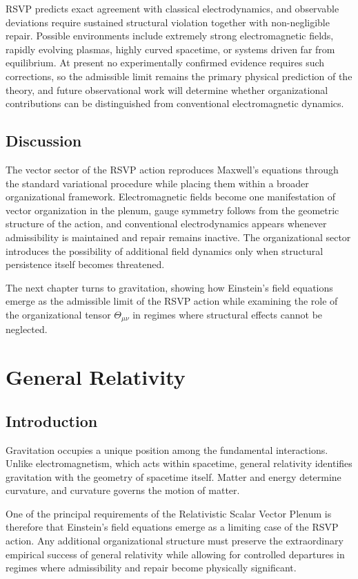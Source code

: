 \documentclass[11pt,oneside]{book}
\numberwithin{equation}{chapter}
\theoremstyle{definition}
\theoremstyle{plain}
\begin{document}
RSVP predicts exact agreement with classical electrodynamics, and observable deviations require sustained structural violation together with non-negligible repair. Possible environments include extremely strong electromagnetic fields, rapidly evolving plasmas, highly curved spacetime, or systems driven far from equilibrium. At present no experimentally confirmed evidence requires such corrections, so the admissible limit remains the primary physical prediction of the theory, and future observational work will determine whether organizational contributions can be distinguished from conventional electromagnetic dynamics.

\section{Discussion}

The vector sector of the RSVP action reproduces Maxwell's equations through the standard variational procedure while placing them within a broader organizational framework. Electromagnetic fields become one manifestation of vector organization in the plenum, gauge symmetry follows from the geometric structure of the action, and conventional electrodynamics appears whenever admissibility is maintained and repair remains inactive. The organizational sector introduces the possibility of additional field dynamics only when structural persistence itself becomes threatened.

The next chapter turns to gravitation, showing how Einstein's field equations emerge as the admissible limit of the RSVP action while examining the role of the organizational tensor \(\Theta_{\mu\nu}\) in regimes where structural effects cannot be neglected.

\chapter{General Relativity}

\section{Introduction}

Gravitation occupies a unique position among the fundamental interactions.
Unlike electromagnetism, which acts within spacetime, general relativity
identifies gravitation with the geometry of spacetime itself. Matter and
energy determine curvature, and curvature governs the motion of matter.

One of the principal requirements of the Relativistic Scalar Vector Plenum
is therefore that Einstein's field equations emerge as a limiting case of
the RSVP action. Any additional organizational structure must preserve the
extraordinary empirical success of general relativity while allowing for
controlled departures in regimes where admissibility and repair become
physically significant.
\end{document}
